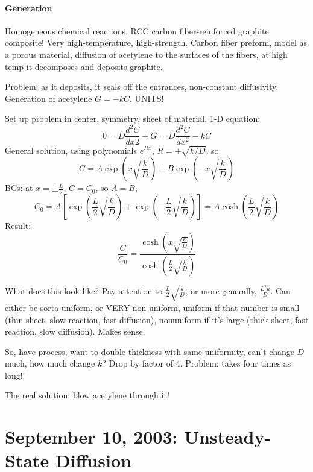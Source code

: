 \documentclass{report}
\begin{document}
\paragraph{Generation} Homogeneous chemical reactions.  RCC carbon
fiber-reinforced graphite composite!  Very high-temperature, high-strength.
Carbon fiber preform, model as a porous material, diffusion of acetylene to the
surfaces of the fibers, at high temp it decomposes and deposits graphite.

\noindent Problem: as it deposits, it seals off the entrances, non-constant
diffusivity.  Generation of acetylene $G = -kC$.  UNITS!

\noindent Set up problem in center, symmetry, sheet of material.  1-D equation:
\begin{equation}
  \label{eq:genbalance}
  0 = D\frac{d^2C}{dx2} + G = D\frac{d^2C}{dx^2} - kC
\end{equation}
General solution, using polynomials $e^{Rx}$, $R=\pm\sqrt{k/D}$, so
\begin{equation}
  \label{eq:gensolution}
  C = A\exp\left(x\sqrt{\frac{k}{D}}\right) +
  B\exp\left(-x\sqrt{\frac{k}{D}}\right)
\end{equation}
BCs: at $x=\pm\frac{L}{2}$, $C=C_0$, so $A=B$,
\begin{equation}
  \label{eq:genbcfit}
  C_0 = A \left[\exp\left(\frac{L}{2}\sqrt{\frac{k}{D}}\right) +
    \exp\left(-\frac{L}{2}\sqrt{\frac{k}{D}}\right)\right] =
  A \cosh\left(\frac{L}{2}\sqrt{\frac{k}{D}}\right)
\end{equation}
Result:
\begin{equation}
  \label{eq:gendone}
  \frac{C}{C_0} = \frac{\cosh\left(x\sqrt{\frac{k}{D}}\right)}
  {\cosh\left(\frac{L}{2}\sqrt{\frac{k}{D}}\right)}
\end{equation}

What does this look like?  Pay attention to $\frac{L}{2}\sqrt{\frac{k}{D}}$, or
more generally, $\frac{L^2 k}{D}$.  Can either be sorta uniform, or VERY
non-uniform, uniform if that number is small (thin sheet, slow reaction, fast
diffusion), nonuniform if it's large (thick sheet, fast reaction, slow
diffusion).  Makes sense.

So, have process, want to double thickness with same uniformity, can't change
$D$ much, how much change $k$?  Drop by factor of 4.  Problem: takes four times
as long!!

The real solution: blow acetylene through it!
\newpage


\section{September 10, 2003: Unsteady-State Diffusion}
\end{document}
